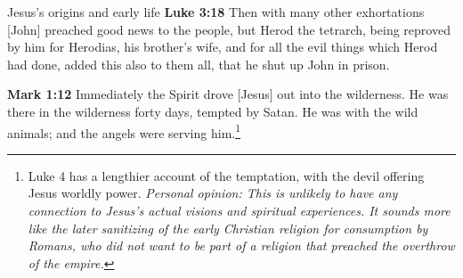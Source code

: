\documentclass[10pt,twoside]{article} %
\newcommand{\doimage}[2]{\texttt{[image: \#2]}\label{fig:#2}}
\newcommand{\figbasic}[4]{ %
    \ifthenelse{\isodd{\pageref{fig:#2}}}{}{\hfill}
    \ifstrempty{#3}{
      \doimage{#1}{#2}
    }{
      \makebox{\doimage{#1}{#2} \\ #3}
    }
    \ifthenelse{\isodd{\pageref{fig:#2}}}{\hfill}{}
    \par
}
\newcommand{\fig}[2][0.4]{
  \figbasic{#1}{#2}{}{}
}
\newcommand{\quotesize}{\normalsize{}}
\newenvironment{quotetext}{\begingroup\quotesize}{\endgroup}
\newcommand{\intex}[1]{\index[texts]{#1}}
\newcommand{\reftex}[1]{#1\intex{#1}}
\newcommand{\bible}[2]{\begin{quotetext}\textbf{#1}\intex{#1} #2\end{quotetext}}
\newcommand{\gospelmark}[2]{\bible{Mark #1}{#2}}
\newcommand{\luke}[2]{\bible{Luke #1}{#2}}
\newcommand{\personal}[1]{\emph{Personal opinion:\/ #1}}
\begin{document}
\begin{section}{Jesus's origins and early life}
\luke{3:18}{Then with many other exhortations [John] preached good news to the people, but Herod the tetrarch, being reproved by him for Herodias, his brother’s wife, and for all the evil things which Herod had done, added this also to them all, that he shut up John in prison.}

\gospelmark{1:12}{Immediately the Spirit drove [Jesus] out into the
wilderness. He was there in the wild\-erness forty days, tempted by
Satan. He was with the wild animals; and the angels were serving him.\footnote{\reftex{Luke 4} has a lengthier account of
the temptation, with the devil offering Jesus worldly power. \personal{This is unlikely to have any connection to
Jesus's actual visions and spiritual experiences. It sounds more like the later sanitizing of the early
Christian religion for consumption by Romans, who did not want to be part of a religion that preached the overthrow
of the empire.}}}
\end{section}

\fig{jesus-in-wilderness}
\end{document}
